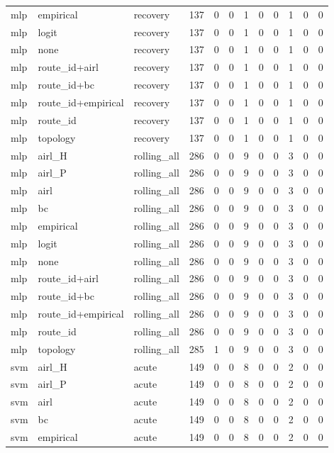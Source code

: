 \begin{tabular}{lllrrrrrrrrr}
mlp & empirical & recovery & 137 & 0 & 0 & 1 & 0 & 0 & 1 & 0 & 0 \\
mlp & logit & recovery & 137 & 0 & 0 & 1 & 0 & 0 & 1 & 0 & 0 \\
mlp & none & recovery & 137 & 0 & 0 & 1 & 0 & 0 & 1 & 0 & 0 \\
mlp & route_id+airl & recovery & 137 & 0 & 0 & 1 & 0 & 0 & 1 & 0 & 0 \\
mlp & route_id+bc & recovery & 137 & 0 & 0 & 1 & 0 & 0 & 1 & 0 & 0 \\
mlp & route_id+empirical & recovery & 137 & 0 & 0 & 1 & 0 & 0 & 1 & 0 & 0 \\
mlp & route_id & recovery & 137 & 0 & 0 & 1 & 0 & 0 & 1 & 0 & 0 \\
mlp & topology & recovery & 137 & 0 & 0 & 1 & 0 & 0 & 1 & 0 & 0 \\
mlp & airl_H & rolling_all & 286 & 0 & 0 & 9 & 0 & 0 & 3 & 0 & 0 \\
mlp & airl_P & rolling_all & 286 & 0 & 0 & 9 & 0 & 0 & 3 & 0 & 0 \\
mlp & airl & rolling_all & 286 & 0 & 0 & 9 & 0 & 0 & 3 & 0 & 0 \\
mlp & bc & rolling_all & 286 & 0 & 0 & 9 & 0 & 0 & 3 & 0 & 0 \\
mlp & empirical & rolling_all & 286 & 0 & 0 & 9 & 0 & 0 & 3 & 0 & 0 \\
mlp & logit & rolling_all & 286 & 0 & 0 & 9 & 0 & 0 & 3 & 0 & 0 \\
mlp & none & rolling_all & 286 & 0 & 0 & 9 & 0 & 0 & 3 & 0 & 0 \\
mlp & route_id+airl & rolling_all & 286 & 0 & 0 & 9 & 0 & 0 & 3 & 0 & 0 \\
mlp & route_id+bc & rolling_all & 286 & 0 & 0 & 9 & 0 & 0 & 3 & 0 & 0 \\
mlp & route_id+empirical & rolling_all & 286 & 0 & 0 & 9 & 0 & 0 & 3 & 0 & 0 \\
mlp & route_id & rolling_all & 286 & 0 & 0 & 9 & 0 & 0 & 3 & 0 & 0 \\
mlp & topology & rolling_all & 285 & 1 & 0 & 9 & 0 & 0 & 3 & 0 & 0 \\
svm & airl_H & acute & 149 & 0 & 0 & 8 & 0 & 0 & 2 & 0 & 0 \\
svm & airl_P & acute & 149 & 0 & 0 & 8 & 0 & 0 & 2 & 0 & 0 \\
svm & airl & acute & 149 & 0 & 0 & 8 & 0 & 0 & 2 & 0 & 0 \\
svm & bc & acute & 149 & 0 & 0 & 8 & 0 & 0 & 2 & 0 & 0 \\
svm & empirical & acute & 149 & 0 & 0 & 8 & 0 & 0 & 2 & 0 & 0 \\

\end{tabular}
